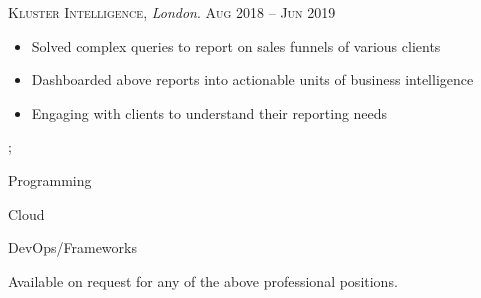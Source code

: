 \documentclass[a4paper]{limecv}
\begin{document}
\begin{cvMainContent}
\begin{cvExperience}
{        \textsc{\selectfont Kluster Intelligence}, \textit{London}. \hfill \textsc{Aug} 2018 -- \textsc{Jun} 2019\\
        \begin{itemize}
        \item Solved complex queries to report on sales funnels of various clients
        \item Dashboarded above reports into actionable units of business intelligence 
        \item Engaging with clients to understand their reporting needs
        \end{itemize}};
    \end{cvExperience}

    \begin{cvEducation}
    \end{cvEducation}
    
    \begin{cvSkills}
      Programming

      Cloud

      DevOps/Frameworks

    \end{cvSkills}
  
    \begin{cvReferences}
      Available on request for any of the above professional positions.
    \end{cvReferences}
  
  \end{cvMainContent}
  
  
\end{document}
